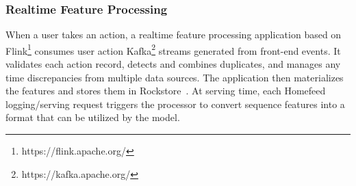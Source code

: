 \subsubsection{Realtime Feature Processing}

When a user takes an action, a realtime feature processing application based on Flink\footnote{https://flink.apache.org/}
 consumes user action Kafka\footnote{https://kafka.apache.org/}
 streams generated from front-end events. It validates each action record, detects and combines duplicates, and manages any time discrepancies from multiple data sources. The application then materializes the features and stores them in Rockstore~\cite{rockstore_blog}. At serving time, each Homefeed logging/serving request triggers the processor to convert sequence features into a format that can be utilized by the model.
 